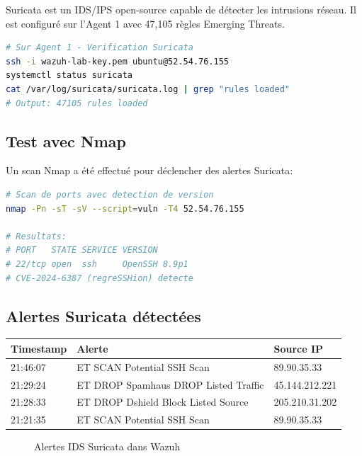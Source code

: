 \documentclass[12pt,a4paper]{article}
\begin{document}
Suricata est un IDS/IPS open-source capable de détecter les intrusions réseau. Il est configuré sur l'Agent 1 avec 47,105 règles Emerging Threats.

\begin{lstlisting}[language=bash]
# Sur Agent 1 - Verification Suricata
ssh -i wazuh-lab-key.pem ubuntu@52.54.76.155
systemctl status suricata
cat /var/log/suricata/suricata.log | grep "rules loaded"
# Output: 47105 rules loaded
\end{lstlisting}

\subsection{Test avec Nmap}

Un scan Nmap a été effectué pour déclencher des alertes Suricata:

\begin{lstlisting}[language=bash]
# Scan de ports avec detection de version
nmap -Pn -sT -sV --script=vuln -T4 52.54.76.155

# Resultats:
# PORT   STATE SERVICE VERSION
# 22/tcp open  ssh     OpenSSH 8.9p1
# CVE-2024-6387 (regreSSHion) detecte
\end{lstlisting}

\subsection{Alertes Suricata détectées}

\begin{center}
\begin{tabular}{|l|l|l|}
\hline
\textbf{Timestamp} & \textbf{Alerte} & \textbf{Source IP} \\
\hline
21:46:07 & ET SCAN Potential SSH Scan & 89.90.35.33 \\
21:29:24 & ET DROP Spamhaus DROP Listed Traffic & 45.144.212.221 \\
21:28:33 & ET DROP Dshield Block Listed Source & 205.210.31.202 \\
21:21:35 & ET SCAN Potential SSH Scan & 89.90.35.33 \\
\hline
\end{tabular}
\end{center}

\begin{figure}[H]
    \centering
    \caption{Alertes IDS Suricata dans Wazuh}
    \label{fig:suricata}
\end{figure}
\end{document}

